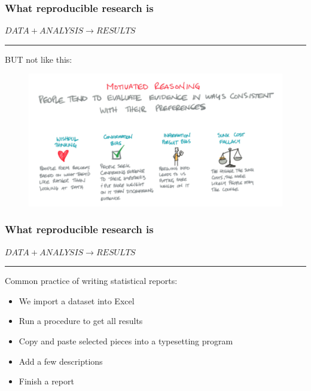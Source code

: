 \documentclass{beamer}
\begin{document}

\begin{frame}
\frametitle{What reproducible research is}
\Large\centering $DATA +  ANALYSIS \rightarrow RESULTS$\\
\pause
\rule{\textwidth}{0.05pt}\vspace{5px}

\centering BUT not like this:
\begin{figure}
\includegraphics[scale=0.25]{figures/motivatedReasoning.png}
\end{figure}
\end{frame}


\begin{frame}
\frametitle{What reproducible research is}
\Large\centering $DATA +  ANALYSIS \rightarrow RESULTS$\\
\rule{\textwidth}{0.05pt}\vspace{20px}
Common practice of writing statistical reports: 
\small\begin{itemize}
    \item We import a dataset into Excel
    \item Run a procedure to get all results
    \item Copy and paste selected pieces into a typesetting program
    \item Add a few descriptions
    \item Finish a report
\end{itemize}

\end{frame}
\end{document}
